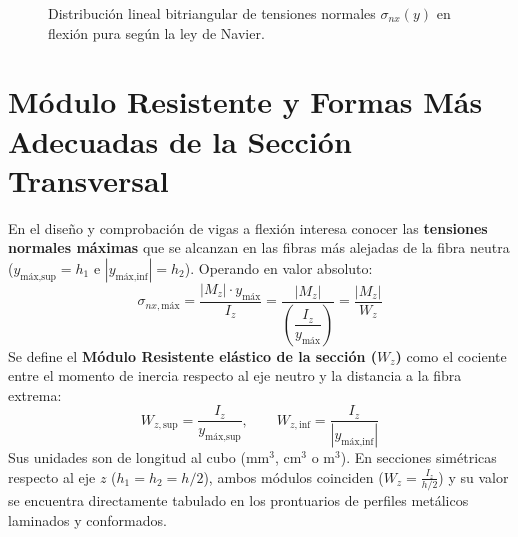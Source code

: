\begin{figure}[H]
{%
    }
    \caption{Distribución lineal bitriangular de tensiones normales $\sigma_{nx}(y)$ en flexión pura según la ley de Navier.}
    \label{fig:distribucion_navier_3d}
\end{figure}

\section{Módulo Resistente y Formas Más Adecuadas de la Sección Transversal}

En el diseño y comprobación de vigas a flexión interesa conocer las \textbf{tensiones normales máximas} que se alcanzan en las fibras más alejadas de la fibra neutra ($y_{\text{máx,sup}} = h_1$ e $|y_{\text{máx,inf}}| = h_2$). Operando en valor absoluto:
\begin{equation}
    \sigma_{nx,\text{máx}} = \frac{|M_z| \cdot y_{\text{máx}}}{I_z} = \frac{|M_z|}{\left(\dfrac{I_z}{y_{\text{máx}}}\right)} = \frac{|M_z|}{W_z}
\end{equation}
Se define el \textbf{Módulo Resistente elástico de la sección ($W_z$)} como el cociente entre el momento de inercia respecto al eje neutro y la distancia a la fibra extrema:
\begin{equation}
    \boxed{W_{z,\text{sup}} = \frac{I_z}{y_{\text{máx,sup}}}, \qquad W_{z,\text{inf}} = \frac{I_z}{|y_{\text{máx,inf}}|}}
    \label{eq:modulo_resistente}
\end{equation}
Sus unidades son de longitud al cubo ($\text{mm}^3$, $\text{cm}^3$ o $\text{m}^3$). En secciones simétricas respecto al eje $z$ ($h_1 = h_2 = h/2$), ambos módulos coinciden ($W_z = \frac{I_z}{h/2}$) y su valor se encuentra directamente tabulado en los prontuarios de perfiles metálicos laminados y conformados.

